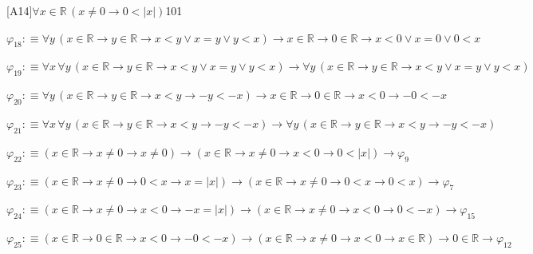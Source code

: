\begin{fullproof}{[A14]}{$\forall x \in \mathbb{R}\,(x \neq 0 \to 0 < \lvert x \rvert)$}{101}
\begin{abbrevlist}
\item $\varphi_{18} :\equiv \forall y\,(x \in \mathbb{R} \to y \in \mathbb{R} \to x < y \lor x = y \lor y < x) \to x \in \mathbb{R} \to 0 \in \mathbb{R} \to x < 0 \lor x = 0 \lor 0 < x$
\item $\varphi_{19} :\equiv \forall x\,\forall y\,(x \in \mathbb{R} \to y \in \mathbb{R} \to x < y \lor x = y \lor y < x) \to \forall y\,(x \in \mathbb{R} \to y \in \mathbb{R} \to x < y \lor x = y \lor y < x)$
\item $\varphi_{20} :\equiv \forall y\,(x \in \mathbb{R} \to y \in \mathbb{R} \to x < y \to -y < -x) \to x \in \mathbb{R} \to 0 \in \mathbb{R} \to x < 0 \to -0 < -x$
\item $\varphi_{21} :\equiv \forall x\,\forall y\,(x \in \mathbb{R} \to y \in \mathbb{R} \to x < y \to -y < -x) \to \forall y\,(x \in \mathbb{R} \to y \in \mathbb{R} \to x < y \to -y < -x)$
\item $\varphi_{22} :\equiv (x \in \mathbb{R} \to x \neq 0 \to x \neq 0) \to (x \in \mathbb{R} \to x \neq 0 \to x < 0 \to 0 < \lvert x \rvert) \to \varphi_{9}$
\item $\varphi_{23} :\equiv (x \in \mathbb{R} \to x \neq 0 \to 0 < x \to x = \lvert x \rvert) \to (x \in \mathbb{R} \to x \neq 0 \to 0 < x \to 0 < x) \to \varphi_{7}$
\item $\varphi_{24} :\equiv (x \in \mathbb{R} \to x \neq 0 \to x < 0 \to -x = \lvert x \rvert) \to (x \in \mathbb{R} \to x \neq 0 \to x < 0 \to 0 < -x) \to \varphi_{15}$
\item $\varphi_{25} :\equiv (x \in \mathbb{R} \to 0 \in \mathbb{R} \to x < 0 \to -0 < -x) \to (x \in \mathbb{R} \to x \neq 0 \to x < 0 \to x \in \mathbb{R}) \to 0 \in \mathbb{R} \to \varphi_{12}$
\end{abbrevlist}
\end{fullproof}
